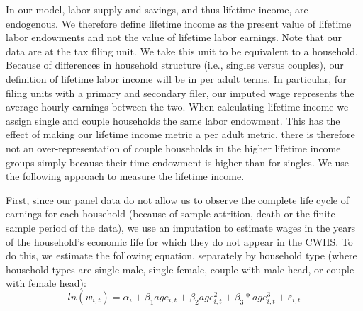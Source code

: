   In our model, labor supply and savings, and thus lifetime income, are endogenous. We therefore define lifetime income as the present value of lifetime labor endowments and not the value of lifetime labor earnings. Note that our data are at the tax filing unit.  We take this unit to be equivalent to a household.  Because of differences in household structure (i.e., singles versus couples), our definition of lifetime labor income will be in per adult terms.  In particular, for filing units with a primary and secondary filer, our imputed wage represents the average hourly earnings between the two. When calculating lifetime income we assign single and couple households the same labor endowment.  This has the effect of making our lifetime income metric a per adult metric, there is therefore not an over-representation of couple households in the higher lifetime income groups simply because their time endowment is higher than for singles. We use the following approach to measure the lifetime income.

  First, since our panel data do not allow us to observe the complete life cycle of earnings for each household (because of sample attrition, death or the finite sample period of the data), we use an imputation to estimate wages in the years of the household's economic life for which they do not appear in the CWHS. To do this, we estimate the following equation, separately by household type (where household types are single male, single female, couple with male head, or couple with female head):
  \begin{equation}\label{eqn:wage_step1}
    ln(w_{i,t}) = \alpha_{i} + \beta_{1}age_{i,t} + \beta_{2}age_{i,t}^{2} + \beta_{3}*age_{i,t}^{3} + \varepsilon_{i,t}
  \end{equation}

